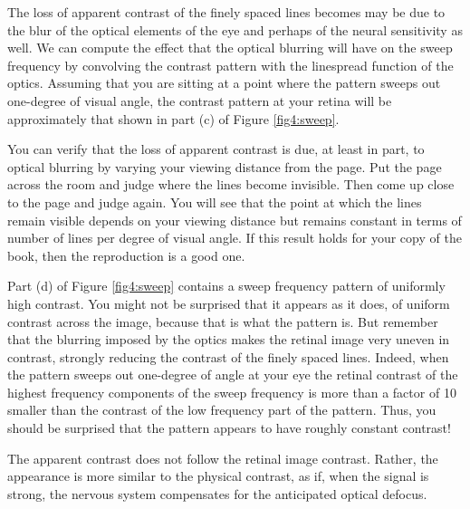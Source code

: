 The loss of apparent contrast of the finely spaced lines
becomes may be due to
the blur of the optical elements of the eye
and perhaps of the neural sensitivity as well.
We can compute the effect that the optical blurring
will have on the sweep frequency by convolving the
contrast pattern with the linespread function of the optics.
Assuming that you are sitting at a point where the pattern
sweeps out one-degree of visual angle, 
the contrast pattern at your retina
will be approximately that shown in part (c) of Figure \ref{fig4:sweep}.

You can verify that the loss of apparent contrast
is due, at least in part, to optical blurring
by varying your viewing distance from the page.
Put the page across the room and judge where the lines
become invisible.
Then come up close to the page and judge again.
You will see that the point
at which the lines remain visible
depends on your viewing distance but remains constant
in terms of number of lines per degree of visual angle.
If this result holds for your copy of the book, then
the reproduction is a good one.

Part (d) of Figure \ref{fig4:sweep}
contains a sweep frequency pattern of uniformly high contrast.
You might not be surprised that it appears as it does,
of uniform contrast across the image, because
that is what the pattern is.
But remember that
the blurring imposed by the optics
makes the retinal image very uneven in contrast,
strongly reducing the contrast of the finely spaced lines.
Indeed, when the pattern sweeps out one-degree of angle at your eye
the retinal contrast of the highest frequency components of
the sweep frequency is more than a factor of 10 smaller than the
contrast of the low frequency part of the pattern.
Thus, you should be surprised that the pattern appears to
have roughly constant contrast!

The apparent contrast does not follow the retinal image contrast.
Rather, the appearance is more similar
to the physical contrast, as if,
when the signal is strong, the nervous system
compensates for the anticipated optical defocus.

